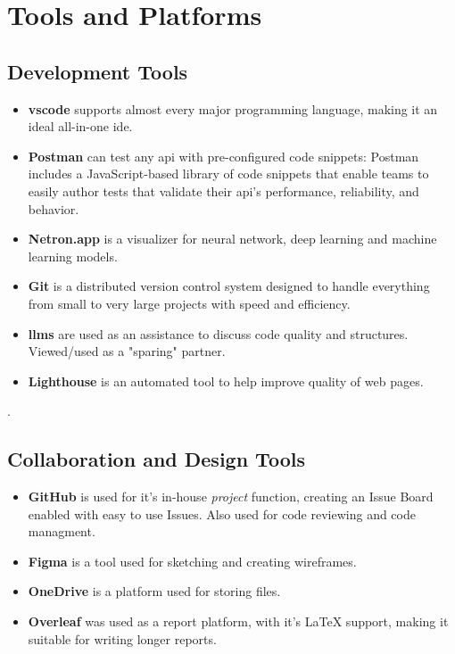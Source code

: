 \section{Tools and Platforms}
\label{sec:tools-and-platforms}

\subsection{Development Tools}
\label{subsec:development-tools}

\begin{itemize}
    \item \textbf{\gls{vscode}} supports almost every major programming language, making it an ideal all-in-one \gls{ide}.
    \item \textbf{Postman} can test any \gls{api} with pre-configured code snippets: Postman includes a JavaScript-based library of code snippets that enable teams to easily author tests that validate their \gls{api}'s performance, reliability, and behavior.
    \item \textbf{Netron.app} is a visualizer for neural network, deep learning and machine learning models.
    \item \textbf{Git} is a distributed version control system designed to handle everything from small to very large projects with speed and efficiency.
    \item \textbf{\glspl{llm}} are used as an assistance to discuss code quality and structures. Viewed/used as a "sparing" partner.
    \item \textbf{Lighthouse} is an automated tool to help improve quality of web pages.
\end{itemize}.

\subsection{Collaboration and Design Tools}
\label{subsec:collaboration-and-design-tools}

\begin{itemize}
    \item \textbf{GitHub} is used for it's in-house \textit{project} function, creating an Issue Board enabled with easy to use Issues. Also used for code reviewing and code managment.
    \item \textbf{Figma} is a tool used for sketching and creating wireframes.
    \item \textbf{OneDrive} is a platform used for storing files.
    \item \textbf{Overleaf} was used as a report platform, with it's LaTeX support, making it suitable for writing longer reports.
\end{itemize}

